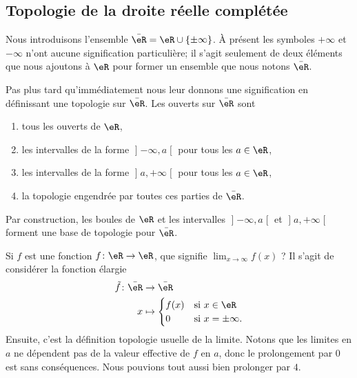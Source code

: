 
\subsection{Topologie de la droite réelle complétée}
\label{SUBSECooKRRUooSlZSmM}

Nous introduisons l'ensemble \( \bar\eR=\eR\cup\{ \pm\infty \}\). À présent les symboles \( +\infty\) et \( -\infty\) n'ont aucune signification particulière; il s'agit seulement de deux éléments que nous ajoutons à \( \eR\) pour former un ensemble que nous notons \( \bar \eR\).

Pas plus tard qu'immédiatement nous leur donnons une signification en définissant une topologie sur \( \bar\eR\). Les ouverts sur \( \bar \eR\) sont
\begin{enumerate}
    \item
        tous les ouverts de \( \eR\),
    \item
        les intervalles de la forme \( \mathopen] -\infty , a \mathclose[\) pour tous les \( a\in \eR\),
    \item
        les intervalles de la forme \( \mathopen] a , +\infty \mathclose[\) pour tous les \( a\in \eR\),
    \item
        la topologie engendrée par toutes ces parties de \( \bar \eR\).
\end{enumerate}

Par construction, les boules de \( \eR\) et les intervalles \( \mathopen] -\infty , a \mathclose[\) et \( \mathopen] a , +\infty \mathclose[\) forment une base de topologie pour \( \bar \eR\).

Si \( f\) est une fonction \( f\colon \eR\to \eR\), que signifie \( \lim_{x\to \infty} f(x)\) ? Il s'agit de considérer la fonction élargie
\begin{equation}
    \begin{aligned}
        \tilde f\colon \bar \eR&\to \bar\eR \\
        x&\mapsto \begin{cases}
            f(x)    &   \text{si } x\in \eR\\
            0    &    \text{si } x=\pm\infty.
        \end{cases}
    \end{aligned}
\end{equation}
Ensuite, c'est la définition topologie usuelle de la limite. Notons que les limites en \( a\) ne dépendent pas de la valeur effective de \( f\) en \( a\), donc le prolongement par \( 0\) est sans conséquences. Nous pouvions tout aussi bien prolonger par \( 4\).

